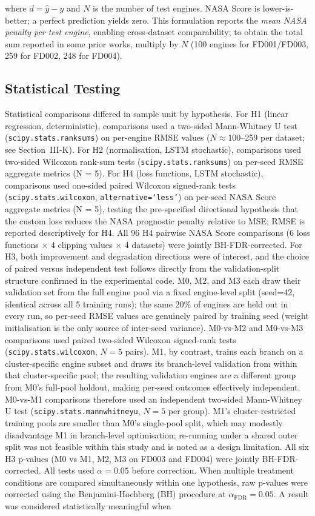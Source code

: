 \documentclass[preprint,10pt]{elsarticle}
\begin{document}
where $d = \hat{y} - y$ and $N$ is the number of test engines. NASA Score is lower-is-better; a perfect prediction yields zero. This formulation reports the \textit{mean NASA penalty per test engine}, enabling cross-dataset comparability; to obtain the total sum reported in some prior works, multiply by $N$ (100 engines for FD001/FD003, 259 for FD002, 248 for FD004).

\subsection{Statistical Testing}

Statistical comparisons differed in sample unit by hypothesis. For H1 (linear regression, deterministic), comparisons used a two-sided Mann-Whitney U test (\texttt{scipy.stats.ranksums}) on per-engine RMSE values ($N \approx 100$--259 per dataset; see Section~III-K). For H2 (normalisation, LSTM stochastic), comparisons used two-sided Wilcoxon rank-sum tests (\texttt{scipy.stats.ranksums}) on per-seed RMSE aggregate metrics (N = 5). For H4 (loss functions, LSTM stochastic), comparisons used one-sided paired Wilcoxon signed-rank tests (\texttt{scipy.stats.wilcoxon}, \texttt{alternative=`less'}) on per-seed NASA Score aggregate metrics (N = 5), testing the pre-specified directional hypothesis that the custom loss reduces the NASA prognostic penalty relative to MSE; RMSE is reported descriptively for H4. All 96 H4 pairwise NASA Score comparisons (6 loss functions $\times$ 4 clipping values $\times$ 4 datasets) were jointly BH-FDR-corrected. For H3, both improvement and degradation directions were of interest, and the choice of paired versus independent test follows directly from the validation-split structure confirmed in the experimental code. M0, M2, and M3 each draw their validation set from the full engine pool via a fixed engine-level split (seed=42, identical across all 5 training runs); the same 20\% of engines are held out in every run, so per-seed RMSE values are genuinely paired by training seed (weight initialisation is the only source of inter-seed variance). M0-vs-M2 and M0-vs-M3 comparisons used paired two-sided Wilcoxon signed-rank tests (\texttt{scipy.stats.wilcoxon}, $N = 5$ pairs). M1, by contrast, trains each branch on a cluster-specific engine subset and draws its branch-level validation from within that cluster-specific pool; the resulting validation engines are a different group from M0's full-pool holdout, making per-seed outcomes effectively independent. M0-vs-M1 comparisons therefore used an independent two-sided Mann-Whitney U test (\texttt{scipy.stats.mannwhitneyu}, $N = 5$ per group). M1's cluster-restricted training pools are smaller than M0's single-pool split, which may modestly disadvantage M1 in branch-level optimisation; re-running under a shared outer split was not feasible within this study and is noted as a design limitation. All six H3 p-values (M0 vs M1, M2, M3 on FD003 and FD004) were jointly BH-FDR-corrected. All tests used $\alpha = 0.05$ before correction. When multiple treatment conditions are compared simultaneously within one hypothesis, raw p-values were corrected using the Benjamini-Hochberg (BH) procedure at $\alpha_{\text{FDR}} = 0.05$. A result was considered statistically meaningful when 
\end{document}
